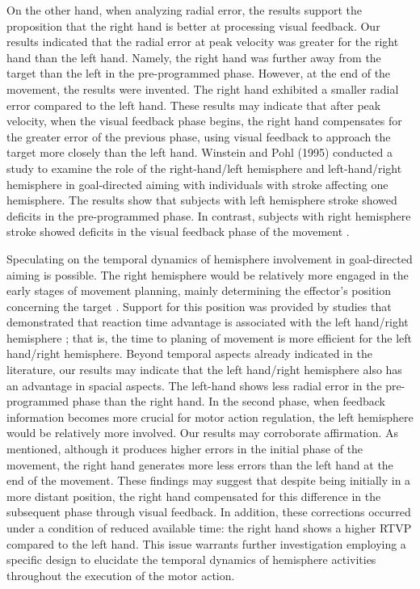 \documentclass[man,a4paper,12pt,floatsintext]{apa6}
\begin{document}
On the other hand, when analyzing radial error, the results support the proposition that the right hand is better at processing visual feedback. Our results indicated that the radial error at peak velocity was greater for the right hand than the left hand. Namely,  the right hand was further away from the target than the left in the pre-programmed phase. However, at the end of the movement, the results were invented. The right hand exhibited a smaller radial error compared to the left hand. These results may indicate that after peak velocity, when the visual feedback phase begins, the right hand compensates for the greater error of the previous phase, using visual feedback to approach the target more closely than the left hand. Winstein and Pohl (1995) conducted a study to examine the role of the right-hand/left hemisphere and left-hand/right hemisphere in goal-directed aiming with individuals with stroke affecting one hemisphere. The results show that subjects with left hemisphere stroke showed deficits in the pre-programmed phase. In contrast, subjects with right hemisphere stroke showed deficits in the visual feedback phase of the movement \citep{Winstein1995}. 

Speculating on the temporal dynamics of hemisphere involvement in goal-directed aiming is possible. The right hemisphere would be relatively more engaged in the early stages of movement planning, mainly determining the effector's position concerning the target \citep{Lavrysen2007}. Support for this position was provided by studies that demonstrated that reaction time advantage is associated with the left hand/right hemisphere \citep{Carson1990}; that is, the time to planing of movement is more efficient for the left hand/right hemisphere. Beyond temporal aspects already indicated in the literature, our results may indicate that the left hand/right hemisphere also has an advantage in spacial aspects. The left-hand shows less radial error in the pre-programmed phase than the right hand. In the second phase, when feedback information becomes more crucial for motor action regulation, the left hemisphere would be relatively more involved. Our results may corroborate affirmation. As mentioned, although it produces higher errors in the initial phase of the movement, the right hand generates more less errors than the left hand at the end of the movement. These findings may suggest that despite being initially in a more distant position, the right hand compensated for this difference in the subsequent phase through visual feedback. In addition, these corrections occurred under a condition of reduced available time: the right hand shows a higher RTVP compared to the left hand. This issue warrants further investigation employing a specific design to elucidate the temporal dynamics of hemisphere activities throughout the execution of the motor action.
\end{document}
